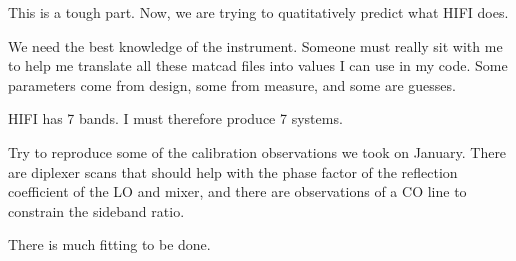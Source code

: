 This is a tough part.  Now, we are trying to quatitatively predict what HIFI does.

We need the best knowledge of the instrument.
Someone must really sit with me to help me translate all these matcad files into values I can use in my code.
Some parameters come from design, some from measure, and some are guesses.

HIFI has 7 bands.  I must therefore produce 7 systems.  

Try to reproduce some of the calibration observations we took on January.  There are diplexer scans that should help with the phase factor of the reflection coefficient of the LO and mixer, and there are observations of a CO line to constrain the sideband ratio.

There is much fitting to be done.

